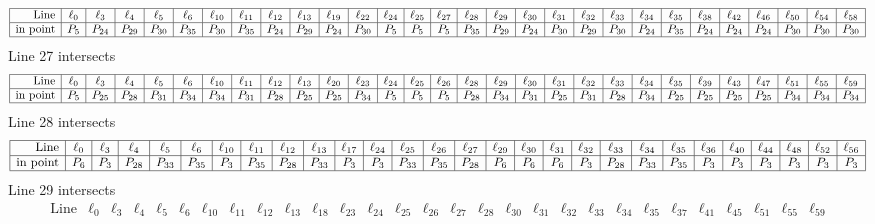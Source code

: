 \documentclass{article}
\begin{document}
{$$\begin{array}{|r*{28}{|c}|}
\hline
\mbox{Line}  & \ell_{0} & \ell_{3} & \ell_{4} & \ell_{5} & \ell_{6} & \ell_{10} & \ell_{11} & \ell_{12} & \ell_{13} & \ell_{19} & \ell_{22} & \ell_{24} & \ell_{25} & \ell_{27} & \ell_{28} & \ell_{29} & \ell_{30} & \ell_{31} & \ell_{32} & \ell_{33} & \ell_{34} & \ell_{35} & \ell_{38} & \ell_{42} & \ell_{46} & \ell_{50} & \ell_{54} & \ell_{58}\\
\hline
\mbox{in point}  & P_{5} & P_{24} & P_{29} & P_{30} & P_{35} & P_{30} & P_{35} & P_{24} & P_{29} & P_{24} & P_{30} & P_{5} & P_{5} & P_{5} & P_{35} & P_{29} & P_{24} & P_{30} & P_{29} & P_{30} & P_{24} & P_{35} & P_{24} & P_{24} & P_{24} & P_{30} & P_{30} & P_{30}\\
\hline
\end{array}
$$
Line 27 intersects 
$$
\begin{array}{|r*{28}{|c}|}
\hline
\mbox{Line}  & \ell_{0} & \ell_{3} & \ell_{4} & \ell_{5} & \ell_{6} & \ell_{10} & \ell_{11} & \ell_{12} & \ell_{13} & \ell_{20} & \ell_{23} & \ell_{24} & \ell_{25} & \ell_{26} & \ell_{28} & \ell_{29} & \ell_{30} & \ell_{31} & \ell_{32} & \ell_{33} & \ell_{34} & \ell_{35} & \ell_{39} & \ell_{43} & \ell_{47} & \ell_{51} & \ell_{55} & \ell_{59}\\
\hline
\mbox{in point}  & P_{5} & P_{25} & P_{28} & P_{31} & P_{34} & P_{34} & P_{31} & P_{28} & P_{25} & P_{25} & P_{34} & P_{5} & P_{5} & P_{5} & P_{28} & P_{34} & P_{31} & P_{25} & P_{31} & P_{28} & P_{34} & P_{25} & P_{25} & P_{25} & P_{25} & P_{34} & P_{34} & P_{34}\\
\hline
\end{array}
$$
Line 28 intersects 
$$
\begin{array}{|r*{27}{|c}|}
\hline
\mbox{Line}  & \ell_{0} & \ell_{3} & \ell_{4} & \ell_{5} & \ell_{6} & \ell_{10} & \ell_{11} & \ell_{12} & \ell_{13} & \ell_{17} & \ell_{24} & \ell_{25} & \ell_{26} & \ell_{27} & \ell_{29} & \ell_{30} & \ell_{31} & \ell_{32} & \ell_{33} & \ell_{34} & \ell_{35} & \ell_{36} & \ell_{40} & \ell_{44} & \ell_{48} & \ell_{52} & \ell_{56}\\
\hline
\mbox{in point}  & P_{6} & P_{3} & P_{28} & P_{33} & P_{35} & P_{3} & P_{35} & P_{28} & P_{33} & P_{3} & P_{3} & P_{33} & P_{35} & P_{28} & P_{6} & P_{6} & P_{6} & P_{3} & P_{28} & P_{33} & P_{35} & P_{3} & P_{3} & P_{3} & P_{3} & P_{3} & P_{3}\\
\hline
\end{array}
$$
Line 29 intersects 
$$
\begin{array}{|r*{28}{|c}|}
\hline
\mbox{Line}  & \ell_{0} & \ell_{3} & \ell_{4} & \ell_{5} & \ell_{6} & \ell_{10} & \ell_{11} & \ell_{12} & \ell_{13} & \ell_{18} & \ell_{23} & \ell_{24} & \ell_{25} & \ell_{26} & \ell_{27} & \ell_{28} & \ell_{30} & \ell_{31} & \ell_{32} & \ell_{33} & \ell_{34} & \ell_{35} & \ell_{37} & \ell_{41} & \ell_{45} & \ell_{51} & \ell_{55} & \ell_{59}\\

\end{array}$$}
\end{document}
